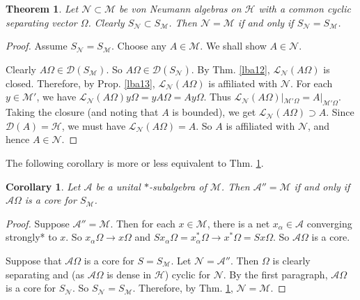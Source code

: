 \documentclass[12pt,b5paper,notitlepage]{article}
\theoremstyle{definition}
\theoremstyle{plain}
\newtheorem{thm}[df]{Theorem}
\newtheorem{co}[df]{Corollary}
\newcommand{\mc}{\mathcal}
\newcommand{\Dom}{\scr{D}}
\newcommand{\scr}{\mathscr}
\numberwithin{equation}{section}
\begin{document}
\begin{thm}\label{lba15}
Let $\mc N\subset\mc M$ be von Neumann algebras on $\mc H$ with a common cyclic separating vector $\Omega$. Clearly $S_{\mc N}\subset S_{\mc M}$. Then $\mc N=\mc M$ if and only if $S_{\mc N}=S_{\mc M}$.
\end{thm}



\begin{proof}
Assume $S_{\mc N}=S_{\mc M}$. Choose any $A\in\mc M$. We shall show $A\in\mc N$. 

Clearly $A\Omega\in\Dom(S_{\mc M})$. So $A\Omega\in\Dom(S_{\mc N})$. By Thm. \ref{lba12},  $\scr L_{\mc N}(A\Omega)$ is  closed. Therefore, by Prop. \ref{lba13}, $\scr L_{\mc N}(A\Omega)$ is affiliated with $\mc N$. For each $y\in\mc M'$, we have $\scr L_{\mc N}(A\Omega)y\Omega=yA\Omega=Ay\Omega$. Thus $\scr L_{\mc N}(A\Omega)|_{\mc M'\Omega}=A|_{\mc M'\Omega}$. Taking the closure (and noting that $A$ is bounded), we get $\scr L_{\mc N}(A\Omega)\supset A$. Since $\Dom(A)=\mc H$, we must have $\scr L_{\mc N}(A\Omega)=A$. So $A$ is affiliated with $\mc N$, and hence $A\in\mc N$.
\end{proof}











The following corollary is more or less equivalent to Thm. \ref{lba15}.

\begin{co}\label{lba16}
Let $\mc A$ be a unital $*$-subalgebra of $\mc M$. Then $\mc A''=\mc M$ if and only if $\mc A\Omega$ is a core for $S_{\mc M}$.
\end{co}

\begin{proof}
Suppose $\mc A''=\mc M$. Then for each $x\in\mc M$, there is a net $x_\alpha\in\mc A$ converging strongly* to $x$. So $x_\alpha\Omega\rightarrow x\Omega$ and $Sx_\alpha\Omega=x_\alpha^*\Omega\rightarrow x^*\Omega=Sx\Omega$. So $\mc A\Omega$ is a core.

Suppose that $\mc A\Omega$ is a core for $S=S_{\mc M}$. Let $\mc N=\mc A''$. Then $\Omega$ is clearly separating and (as $\mc A\Omega$ is dense in $\mc H$) cyclic for $\mc N$. By the first paragraph, $\mc A\Omega$ is a core for $S_{\mc N}$. So $S_{\mc N}=S_{\mc M}$. Therefore, by Thm. \ref{lba15}, $\mc N=\mc M$.
\end{proof}
\end{document}
